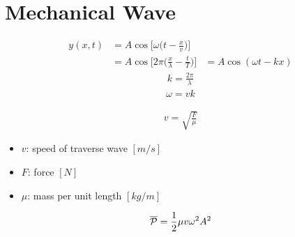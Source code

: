 \chapter{Mechanical Wave}


\begin{multicols}{3}


     \begin{align*}
        y(x, t) &= A\cos\bigg[\omega\bigg(t - \frac{x}{v}\bigg)\bigg] \\
                &= A\cos\bigg[2\pi\bigg(\frac{x}{\lambda} - \frac{t}{T}\bigg)\bigg]
                &= A\cos(\omega t - kx)
     \end{align*}
    \begin{align*}
      k = \frac{2\pi}{\lambda}
    \end{align*}
    \begin{align*}
      \omega = vk
    \end{align*}


  \begin{align*}
    v = \sqrt{\frac{F}{\mu}}
  \end{align*}
  \begin{itemize}
    \item $v$: speed of traverse wave $[m/s]$
    \item $F$: force $[N]$
    \item $\mu$: mass per unit length $[kg/m]$
  \end{itemize}


  \begin{align*}
    \mathcal{\overline{P}} = \frac{1}{2} \mu v \omega^2 A^2
  \end{align*}

\end{multicols}
